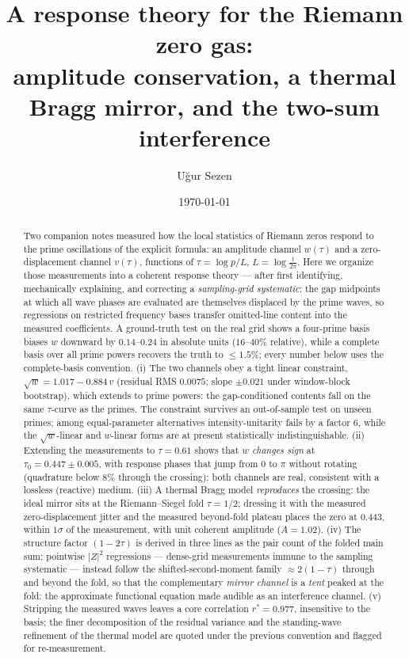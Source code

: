 \documentclass[12pt]{amsart}
\title[A response theory for the Riemann zero gas]{A response theory for
the Riemann zero gas:\\ amplitude conservation, a thermal Bragg mirror,
and the two-sum interference}
\author{U\u{g}ur Sezen}
\date{\today}
\begin{document}
\begin{abstract}
Two companion notes measured how the local statistics of Riemann zeros
respond to the prime oscillations of the explicit formula: an amplitude
channel $w(\tau)$ and a zero-displacement channel $v(\tau)$, functions of
$\tau = \log p / L$, $L = \log\frac{t}{2\pi}$. Here we organize those
measurements into a coherent response theory --- after first identifying,
mechanically explaining, and correcting a \emph{sampling-grid
systematic}: the gap midpoints at which all wave phases are evaluated are
themselves displaced by the prime waves, so regressions on restricted
frequency bases transfer omitted-line content into the measured
coefficients. A ground-truth test on the real grid shows a four-prime
basis biases $w$ downward by $0.14$--$0.24$ in absolute units
($16$--$40\%$ relative), while a complete basis over all prime powers
recovers the truth to $\le 1.5\%$; every number below uses the
complete-basis convention. (i) The two channels obey a tight
linear constraint, $\sqrt{w} = 1.017 - 0.884\,v$ (residual RMS $0.0075$;
slope $\pm 0.021$ under window-block bootstrap), which extends to
prime powers: the gap-conditioned contents fall on the same
$\tau$-curve as the primes.
The constraint survives an out-of-sample test on unseen primes; among
equal-parameter alternatives intensity-unitarity fails by a factor $6$,
while the $\sqrt{w}$-linear and $w$-linear forms are at present
statistically indistinguishable. (ii) Extending the measurements to
$\tau = 0.61$ shows that $w$ \emph{changes sign} at
$\tau_0 = 0.447 \pm 0.005$, with response phases that jump from $0$ to
$\pi$ without rotating (quadrature below $8\%$ through the crossing):
both channels are real, consistent with a lossless (reactive) medium.
(iii) A thermal Bragg model \emph{reproduces} the crossing: the ideal
mirror sits at the Riemann--Siegel fold $\tau = 1/2$; dressing it with
the measured zero-displacement jitter and the measured beyond-fold
plateau places the zero at $0.443$, within $1\sigma$ of the measurement,
with unit coherent amplitude ($A = 1.02$). (iv) The structure factor
$(1-2\tau)$ is derived in three lines as the pair count of the folded
main sum; pointwise $|Z|^2$ regressions --- dense-grid measurements
immune to the sampling systematic --- instead follow the
shifted-second-moment family $\approx 2(1-\tau)$ through and beyond the
fold, so that the complementary \emph{mirror channel} is a \emph{tent}
peaked at the fold: the approximate functional equation made audible as
an interference channel. (v) Stripping the measured waves leaves a core
correlation $r^* = 0.977$, insensitive to the basis; the finer
decomposition of the residual variance and the standing-wave refinement
of the thermal model are quoted under the previous convention and
flagged for re-measurement.
\end{abstract}
\end{document}

